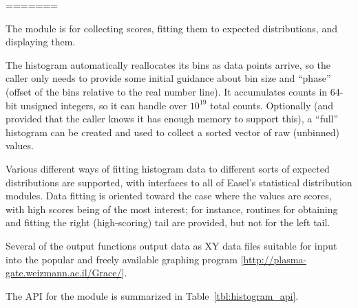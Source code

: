 =======

The  module is for collecting scores, fitting
them to expected distributions, and displaying them.

The histogram automatically reallocates its bins as data points
arrive, so the caller only needs to provide some initial guidance
about bin size and ``phase'' (offset of the bins relative to the real
number line).  It accumulates counts in 64-bit unsigned integers, so
it can handle over $10^19$ total counts.  Optionally (and provided
that the caller knows it has enough memory to support this), a
``full'' histogram can be created and used to collect a sorted vector
of raw (unbinned) values.

Various different ways of fitting histogram data to different sorts of
expected distributions are supported, with interfaces to all of
Easel's statistical distribution modules. Data fitting is oriented
toward the case where the values are scores, with high scores being of
the most interest; for instance, routines for obtaining and fitting
the right (high-scoring) tail are provided, but not for the left tail.

Several of the output functions output data as XY data files suitable
for input into the popular and freely available 
graphing program [\url{http://plasma-gate.weizmann.ac.il/Grace/}].

The API for the  module is summarized in
Table~\ref{tbl:histogram_api}.

